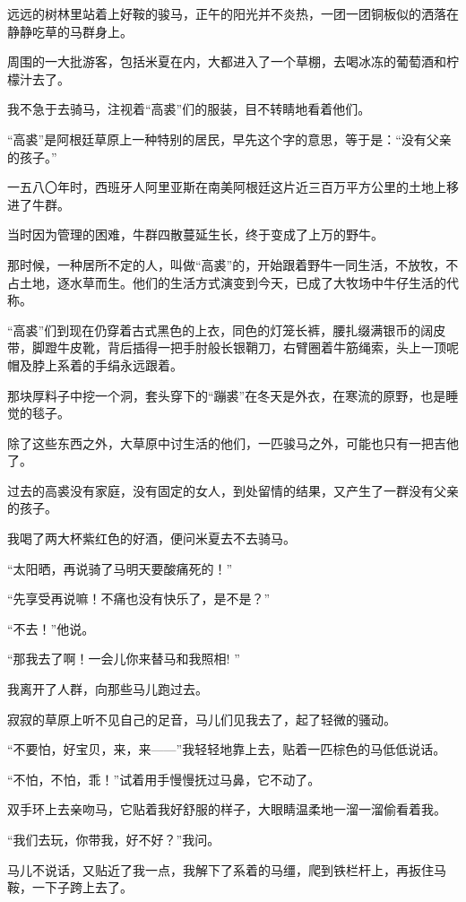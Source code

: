 \par 远远的树林里站着上好鞍的骏马，正午的阳光并不炎热，一团一团铜板似的洒落在静静吃草的马群身上。
\par 周围的一大批游客，包括米夏在内，大都进入了一个草棚，去喝冰冻的葡萄酒和柠檬汁去了。
\par 我不急于去骑马，注视着“高裘”们的服装，目不转睛地看着他们。
\par “高裘”是阿根廷草原上一种特别的居民，早先这个字的意思，等于是：“没有父亲的孩子。”
\par 一五八〇年时，西班牙人阿里亚斯在南美阿根廷这片近三百万平方公里的土地上移进了牛群。
\par 当时因为管理的困难，牛群四散蔓延生长，终于变成了上万的野牛。
\par 那时候，一种居所不定的人，叫做“高裘”的，开始跟着野牛一同生活，不放牧，不占土地，逐水草而生。他们的生活方式演变到今天，已成了大牧场中牛仔生活的代称。
\par “高裘”们到现在仍穿着古式黑色的上衣，同色的灯笼长裤，腰扎缀满银币的阔皮带，脚蹬牛皮靴，背后插得一把手肘般长银鞘刀，右臂圈着牛筋绳索，头上一顶呢帽及脖上系着的手绢永远跟着。
\par 那块厚料子中挖一个洞，套头穿下的“蹦裘”在冬天是外衣，在寒流的原野，也是睡觉的毯子。
\par 除了这些东西之外，大草原中讨生活的他们，一匹骏马之外，可能也只有一把吉他了。
\par 过去的高裘没有家庭，没有固定的女人，到处留情的结果，又产生了一群没有父亲的孩子。
\par 我喝了两大杯紫红色的好酒，便问米夏去不去骑马。
\par “太阳晒，再说骑了马明天要酸痛死的！”
\par “先享受再说嘛！不痛也没有快乐了，是不是？”
\par “不去！”他说。
\par “那我去了啊！一会儿你来替马和我照相! ”
\par 我离开了人群，向那些马儿跑过去。
\par 寂寂的草原上听不见自己的足音，马儿们见我去了，起了轻微的骚动。
\par “不要怕，好宝贝，来，来——”我轻轻地靠上去，贴着一匹棕色的马低低说话。
\par “不怕，不怕，乖！”试着用手慢慢抚过马鼻，它不动了。
\par 双手环上去亲吻马，它贴着我好舒服的样子，大眼睛温柔地一溜一溜偷看着我。
\par “我们去玩，你带我，好不好？”我问。
\par 马儿不说话，又贴近了我一点，我解下了系着的马缰，爬到铁栏杆上，再扳住马鞍，一下子跨上去了。
